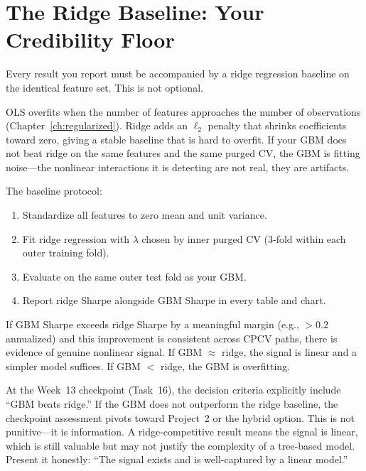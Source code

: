 \section{The Ridge Baseline: Your Credibility Floor}
\label{sec:validation:ridge-baseline}

Every result you report must be accompanied by a ridge regression baseline on the identical feature set. This is not optional.

\begin{keyidea}
OLS overfits when the number of features approaches the number of observations (Chapter~\ref{ch:regularized}). Ridge adds an $\ell_2$ penalty that shrinks coefficients toward zero, giving a stable baseline that is hard to overfit. If your GBM does not beat ridge on the same features and the same purged CV, the GBM is fitting noise---the nonlinear interactions it is detecting are not real, they are artifacts.
\end{keyidea}

The baseline protocol:
\begin{enumerate}[nosep]
  \item Standardize all features to zero mean and unit variance.
  \item Fit ridge regression with $\lambda$ chosen by inner purged CV (3-fold within each outer training fold).
  \item Evaluate on the same outer test fold as your GBM.
  \item Report ridge Sharpe alongside GBM Sharpe in every table and chart.
\end{enumerate}

If GBM Sharpe exceeds ridge Sharpe by a meaningful margin (e.g., $> 0.2$ annualized) and this improvement is consistent across CPCV paths, there is evidence of genuine nonlinear signal. If GBM $\approx$ ridge, the signal is linear and a simpler model suffices. If GBM $<$ ridge, the GBM is overfitting.

\begin{projectconnection}
At the Week~13 checkpoint (Task~16), the decision criteria explicitly include ``GBM beats ridge.'' If the GBM does not outperform the ridge baseline, the checkpoint assessment pivots toward Project~2 or the hybrid option. This is not punitive---it is information. A ridge-competitive result means the signal is linear, which is still valuable but may not justify the complexity of a tree-based model. Present it honestly: ``The signal exists and is well-captured by a linear model.''
\end{projectconnection}

